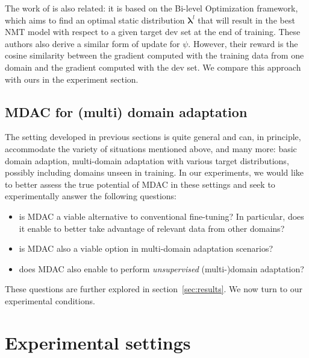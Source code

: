 \documentclass[11pt]{article}
\newcommand{\fyDone}[1]{\done[FY]\Todo[FY:]{\textcolor{orange}{#1}}}
\newcommand{\vlambda}{\ensuremath{\boldsymbol\lambda}\xspace} %
\begin{document}
The work of \citet{Wang20balancing} is also related: it is based on the Bi-level Optimization framework, which aims to find an optimal static distribution $\vlambda^{l}$ that will result in the best NMT model with respect to a given target dev set at the end of training. These authors also derive a similar form of update for $\psi$. However, their reward is the cosine similarity between the gradient computed with the training data from one domain and the gradient computed with the dev set. We compare this approach with ours in the experiment section.

\subsection{MDAC for (multi) domain adaptation}
The setting developed in previous sections is quite general and can, in principle, accommodate the variety of situations mentioned above, and many more: basic domain adaption, multi-domain adaptation with various target distributions, possibly including domains unseen in training. In our experiments, we would like to better assess the true potential of MDAC in these settings and seek to experimentally answer the following questions:
\begin{itemize}
\item is MDAC a viable alternative to conventional fine-tuning? In particular, does it enable to better take advantage of relevant data from other domains?
\item is MDAC also a viable option in multi-domain adaptation scenarios?
\item does MDAC also enable to perform \emph{unsupervised} (multi-)domain adaptation? \fyDone{TBContinued}
\end{itemize}
These questions are further explored in section~\ref{sec:results}. We now turn to our experimental conditions.

\section{Experimental settings} \label{sec:exp}
\end{document}
